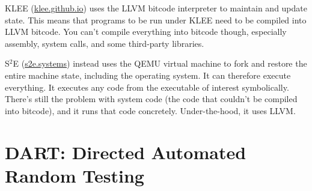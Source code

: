 \documentclass[11pt]{article}
\begin{document}
KLEE (\url{klee.github.io}) uses the LLVM bitcode interpreter to maintain and update state. This means that programs to be run under KLEE need to be compiled into LLVM bitcode.
You can't compile everything into bitcode though, especially assembly, system calls, and some third-party libraries.

S$^2$E (\url{s2e.systems}) instead uses the QEMU virtual machine to fork and restore the entire machine state, including the operating system. It can therefore execute everything.
It executes any code from the executable of interest symbolically. There's still the problem with system code (the code that couldn't be compiled into bitcode), and it runs that
code concretely. Under-the-hood, it uses LLVM.

\section{DART: Directed Automated Random Testing}



\end{document}
